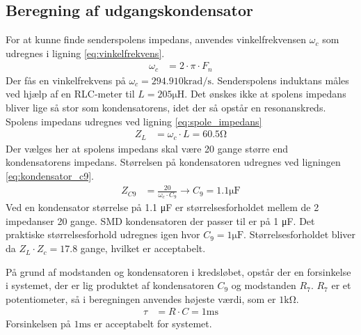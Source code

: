 \subsection{Beregning af udgangskondensator}
For at kunne finde senderspolens impedans, anvendes vinkelfrekvensen $\omega_c$ som udregnes i ligning \ref{eq:vinkelfrekvens}.
\begin{align}
	\omega_c & = 2 \cdot \pi \cdot F_n \label{eq:vinkelfrekvens}
\end{align}
Der fås en vinkelfrekvens på $\omega_c = 294.910 \si{\kilo\radian\per\second}$.
Senderspolens induktans måles ved hjælp af en RLC-meter til $L = 205 \si{\micro \henry}$.
Det ønskes ikke at spolens impedans bliver lige så stor som kondensatorens, idet der så opstår en resonanskreds. 
Spolens impedans udregnes ved ligning \ref{eq:spole_impedans}
\begin{align}
	Z_L & = \omega_c \cdot L = 60.5 \si{\ohm} \label{eq:spole_impedans}
\end{align}
Der vælges her at spolens impedans skal være 20 gange større end kondensatorens impedans. Størrelsen på kondensatoren udregnes ved ligningen \ref{eq:kondensator_c9}.
\begin{align}
	Z_{C9} & = \frac{20}{\omega_c \cdot C_9} \rightarrow C_9 = 1.1 \si{\micro\farad} \label{eq:kondensator_c9}
\end{align}
Ved en kondensator størrelse på 1.1 \si{\micro\farad} er størrelsesforholdet mellem de 2 impedanser 20 gange. 
SMD kondensatoren der passer til er på 1 \si{\micro\farad}. Det praktiske størrelsesforhold udregnes igen hvor $C_9 = 1 \si{\micro\farad}$. Størrelsesforholdet bliver da $Z_L \cdot Z_c = 17.8$ gange, hvilket er acceptabelt.

På grund af modstanden og kondensatoren i kredsløbet, opstår der en forsinkelse i systemet, der er lig produktet af kondensatoren $C_9$ og modstanden $R_7$. $R_7$ er et potentiometer, så i beregningen anvendes højeste værdi, som er $1\si{\kilo\ohm}$.
\begin{align}
	\tau & = R \cdot C = 1 \si{\milli\second}
\end{align}
Forsinkelsen på $1 \si{\milli\second}$ er acceptabelt for systemet.

